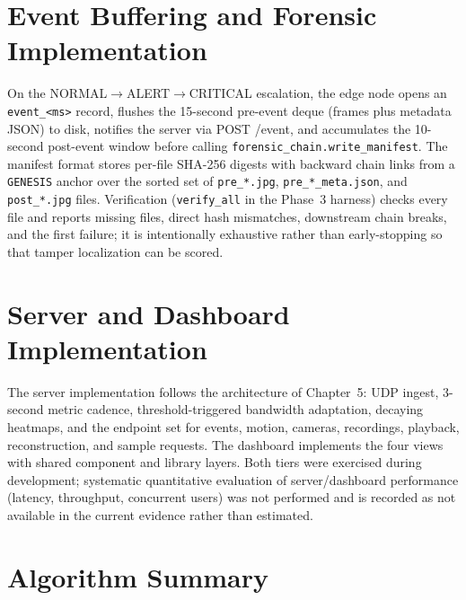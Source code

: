 \section{Event Buffering and Forensic Implementation}

On the NORMAL$\rightarrow$ALERT$\rightarrow$CRITICAL escalation, the edge node opens an \texttt{event\_\textless ms\textgreater} record, flushes the 15-second pre-event deque (frames plus metadata JSON) to disk, notifies the server via POST /event, and accumulates the 10-second post-event window before calling \texttt{forensic\_chain.write\_manifest}. The manifest format stores per-file SHA-256 digests with backward chain links from a \texttt{GENESIS} anchor over the sorted set of \texttt{pre\_*.jpg}, \texttt{pre\_*\_meta.json}, and \texttt{post\_*.jpg} files. Verification (\texttt{verify\_all} in the Phase~3 harness) checks every file and reports missing files, direct hash mismatches, downstream chain breaks, and the first failure; it is intentionally exhaustive rather than early-stopping so that tamper localization can be scored.

\section{Server and Dashboard Implementation}

The server implementation follows the architecture of Chapter~5: UDP ingest, 3-second metric cadence, threshold-triggered bandwidth adaptation, decaying heatmaps, and the endpoint set for events, motion, cameras, recordings, playback, reconstruction, and sample requests. The dashboard implements the four views with shared component and library layers. Both tiers were exercised during development; systematic quantitative evaluation of server/dashboard performance (latency, throughput, concurrent users) was not performed and is recorded as not available in the current evidence rather than estimated.

\section{Algorithm Summary}

